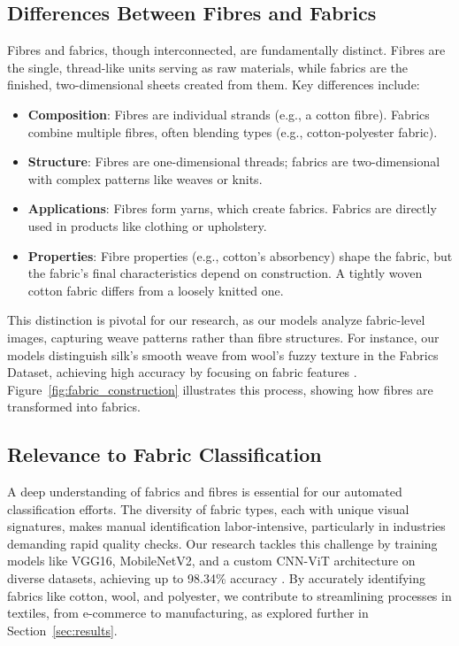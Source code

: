 \subsection{Differences Between Fibres and Fabrics}
\label{subsec:differences}

Fibres and fabrics, though interconnected, are fundamentally distinct. Fibres are the single, thread-like units serving as raw materials, while fabrics are the finished, two-dimensional sheets created from them. Key differences include:
\begin{itemize}
    \item \textbf{Composition}: Fibres are individual strands (e.g., a cotton fibre). Fabrics combine multiple fibres, often blending types (e.g., cotton-polyester fabric).
    \item \textbf{Structure}: Fibres are one-dimensional threads; fabrics are two-dimensional with complex patterns like weaves or knits.
    \item \textbf{Applications}: Fibres form yarns, which create fabrics. Fabrics are directly used in products like clothing or upholstery.
    \item \textbf{Properties}: Fibre properties (e.g., cotton’s absorbency) shape the fabric, but the fabric’s final characteristics depend on construction. A tightly woven cotton fabric differs from a loosely knitted one.
\end{itemize}

This distinction is pivotal for our research, as our models analyze fabric-level images, capturing weave patterns rather than fibre structures. For instance, our models distinguish silk’s smooth weave from wool’s fuzzy texture in the Fabrics Dataset, achieving high accuracy by focusing on fabric features \citep{Kampouris2016, Jatav2025}. Figure~\ref{fig:fabric_construction} illustrates this process, showing how fibres are transformed into fabrics.


\subsection{Relevance to Fabric Classification}
\label{subsec:relevance}

A deep understanding of fabrics and fibres is essential for our automated classification efforts. The diversity of fabric types, each with unique visual signatures, makes manual identification labor-intensive, particularly in industries demanding rapid quality checks. Our research tackles this challenge by training models like VGG16, MobileNetV2, and a custom \ac{CNN}-\ac{ViT} architecture on diverse datasets, achieving up to 98.34\% accuracy \citep{Jatav2025}. By accurately identifying fabrics like cotton, wool, and polyester, we contribute to streamlining processes in textiles, from e-commerce to manufacturing, as explored further in Section~\ref{sec:results}.